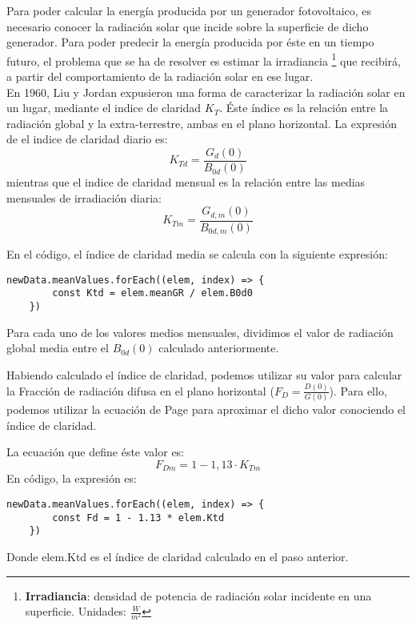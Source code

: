 Para poder calcular la energía producida por un generador fotovoltaico, es necesario conocer la radiación solar que incide sobre la superficie de dicho generador. Para poder predecir la energía producida por éste en un tiempo futuro, el problema que se ha de resolver es estimar la irradiancia \footnote{\textbf{Irradiancia}: densidad de potencia de radiación solar incidente en una superficie. Unidades: $\frac{W}{m^2}$} que recibirá, a partir del comportamiento de la radiación solar en ese lugar.\\

En 1960, Liu y Jordan \cite{lj60} expusieron una forma de caracterizar la radiación solar en un lugar, mediante el indice de claridad $K_T$. Éste índice es la relación entre la radiación global y la extra-terrestre, ambas en el plano horizontal. La expresión de el indice de claridad diario es:\\

\begin{equation}
K_{Td} = \frac{G_d(0)}{B_{0d}(0)}
\end{equation}
mientras que el indice de claridad mensual es la relación entre las medias mensuales de irradiación diaria:
\begin{equation}
K_{Tm} = \frac{G_{d,m}(0)}{B_{0d,m}(0)}
\end{equation}

En el código, el índice de claridad media se calcula con la siguiente expresión:
\begin{lstlisting}[style=ES6, caption={Índice de claridad diario}]
	newData.meanValues.forEach((elem, index) => {
		const Ktd = elem.meanGR / elem.B0d0
	})
\end{lstlisting}
Para cada uno de los valores medios mensuales, dividimos el valor de radiación global media entre el $B_{0d}(0)$ calculado anteriormente.

Habiendo calculado el índice de claridad, podemos utilizar su valor para calcular la Fracción de radiación difusa en el plano horizontal ($F_D=\frac{D(0)}{G(0)}$). Para ello, podemos utilizar la ecuación de Page para aproximar el dicho valor conociendo el índice de claridad.

La ecuación que define éste valor es:
\begin{equation}\label{eqn_page}
F_{Dm}=1-1,13·K_{Tm}
\end{equation}
En código, la expresión es:
\begin{lstlisting}[style=ES6, caption={Fracción de difusa}]
	newData.meanValues.forEach((elem, index) => {
		const Fd = 1 - 1.13 * elem.Ktd
	})
\end{lstlisting}
Donde elem.Ktd es el índice de claridad calculado en el paso anterior.

